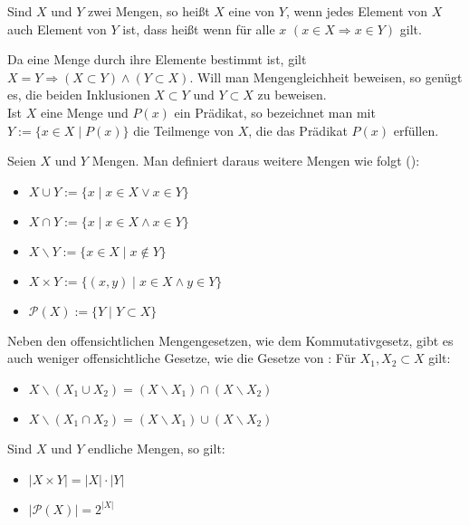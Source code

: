 \begin{definition}[Teilmenge]
	Sind $X$ und $Y$ zwei Mengen, so heißt $X$ eine  von 
	$Y$, wenn jedes Element von $X$ auch Element von $Y$ ist, dass heißt wenn für alle 
	$x$ $(x \in X \Rightarrow x \in Y)$ gilt.
\end{definition}

Da eine Menge durch ihre Elemente bestimmt ist, gilt $X = Y \Rightarrow (X \subset Y)\land
(Y \subset X)$. Will man Mengengleichheit beweisen, so genügt es, die beiden Inklusionen
$X \subset Y$ und $Y \subset X$ zu beweisen. \\


Ist $X$ eine Menge und $P(x)$ ein Prädikat, so bezeichnet man mit $Y:= \{x \in X \mid
P(x)\}$ die Teilmenge von $X$, die das Prädikat $P(x)$ erfüllen. \\

\begin{definition}[Mengenoperationen]
	Seien $X$ und $Y$ Mengen. Man definiert daraus 
	weitere Mengen wie folgt ():
	\begin{itemize}
		\item $X \cup Y := \{x \mid x \in X \lor x \in Y\}$
		\item $X \cap Y := \{x \mid x \in X \land x \in Y\}$
		\item $X \backslash Y := \{x \in X \mid x \notin Y\}$
		\item $X \times Y := \{(x,y) \mid x \in X \land y \in Y\}$
		\item $\mathcal P(X) := \{Y \mid Y \subset X\}$
	\end{itemize}
\end{definition}

Neben den offensichtlichen Mengengesetzen, wie dem Kommutativgesetz, gibt es auch weniger 
offensichtliche Gesetze, wie die Gesetze von : Für $X_1, X_2 \subset X$ gilt:
\begin{itemize}
	\item $X \backslash (X_1 \cup X_2) = (X \backslash X_1) \cap (X \backslash X_2)$
	\item $X \backslash (X_1 \cap X_2) = (X \backslash X_1) \cup (X \backslash X_2)$
\end{itemize}


Sind $X$ und $Y$ endliche Mengen, so gilt:
\begin{itemize}
	\item $|X \times Y| = |X| \cdot |Y|$
	\item $|\mathcal P(X)| = 2^{|X|}$
\end{itemize}
